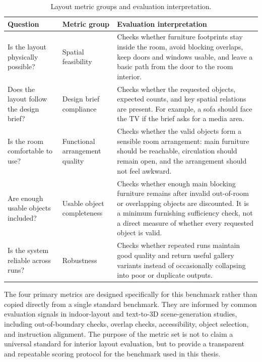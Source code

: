 \begingroup
\small
\setlength{\tabcolsep}{4pt}
\renewcommand{\arraystretch}{1.15}
\begin{xltabular}{\textwidth}{|>{\raggedright\arraybackslash}X|>{\raggedright\arraybackslash}X|>{\raggedright\arraybackslash}X|}
\caption{Layout metric groups and evaluation interpretation.}\label{tab:7-4}\\
\hline
\textbf{Question} & \textbf{Metric group} & \textbf{Evaluation interpretation} \\
\hline
Is the layout physically possible? & Spatial feasibility & Checks whether furniture footprints stay inside the room, avoid blocking overlaps, keep doors and windows usable, and leave a basic path from the door to the room interior. \\
\hline
Does the layout follow the design brief? & Design brief compliance & Checks whether the requested objects, expected counts, and key spatial relations are present. For example, a sofa should face the TV if the brief asks for a media area. \\
\hline
Is the room comfortable to use? & Functional arrangement quality & Checks whether the valid objects form a sensible room arrangement: main furniture should be reachable, circulation should remain open, and the arrangement should not feel awkward. \\
\hline
Are enough usable objects included? & Usable object completeness & Checks whether enough main blocking furniture remains after invalid out-of-room or overlapping objects are discounted. It is a minimum furnishing sufficiency check, not a direct measure of whether every requested object is valid. \\
\hline
Is the system reliable across runs? & Robustness & Checks whether repeated runs maintain good quality and return useful gallery variants instead of occasionally collapsing into poor or duplicate outputs. \\
\hline
\end{xltabular}
\endgroup

The four primary metrics are designed specifically for this benchmark rather than copied directly from a single standard benchmark. They are informed by common evaluation signals in indoor-layout and text-to-3D scene-generation studies, including out-of-boundary checks, overlap checks, accessibility, object selection, and instruction alignment. The purpose of the metric set is not to claim a universal standard for interior layout evaluation, but to provide a transparent and repeatable scoring protocol for the benchmark used in this thesis.

